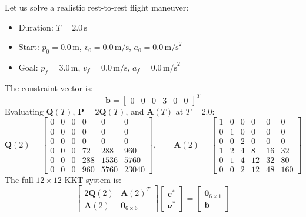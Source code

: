 \documentclass[11pt,a4paper]{article}
\begin{document}
Let us solve a realistic rest-to-rest flight maneuver:
\begin{itemize}
    \item Duration: $T = 2.0\,\text{s}$
    \item Start: $p_0 = 0.0\,\text{m}$, $v_0 = 0.0\,\text{m/s}$, $a_0 = 0.0\,\text{m/s}^2$
    \item Goal: $p_f = 3.0\,\text{m}$, $v_f = 0.0\,\text{m/s}$, $a_f = 0.0\,\text{m/s}^2$
\end{itemize}
The constraint vector is:
\begin{equation}
\mathbf{b} = \begin{bmatrix} 0 & 0 & 0 & 3 & 0 & 0 \end{bmatrix}^T
\end{equation}
Evaluating $\mathbf{Q}(T)$, $\mathbf{P} = 2\mathbf{Q}(T)$, and $\mathbf{A}(T)$ at $T = 2.0$:
\begin{equation}
\mathbf{Q}(2) = \begin{bmatrix}
0 & 0 & 0 & 0 & 0 & 0 \\
0 & 0 & 0 & 0 & 0 & 0 \\
0 & 0 & 0 & 0 & 0 & 0 \\
0 & 0 & 0 & 72 & 288 & 960 \\
0 & 0 & 0 & 288 & 1536 & 5760 \\
0 & 0 & 0 & 960 & 5760 & 23040
\end{bmatrix}, \qquad
\mathbf{A}(2) = \begin{bmatrix}
1 & 0 & 0 & 0 & 0 & 0 \\
0 & 1 & 0 & 0 & 0 & 0 \\
0 & 0 & 2 & 0 & 0 & 0 \\
1 & 2 & 4 & 8 & 16 & 32 \\
0 & 1 & 4 & 12 & 32 & 80 \\
0 & 0 & 2 & 12 & 48 & 160
\end{bmatrix}
\end{equation}
The full $12 \times 12$ KKT system is:
\begin{equation}
\begin{bmatrix}
2\mathbf{Q}(2) & \mathbf{A}(2)^T \\
\mathbf{A}(2) & \mathbf{0}_{6 \times 6}
\end{bmatrix}
\begin{bmatrix}
\mathbf{c}^* \\
\boldsymbol{\nu}^*
\end{bmatrix}
=
\begin{bmatrix}
\mathbf{0}_{6 \times 1} \\
\mathbf{b}
\end{bmatrix}
\end{equation}
\end{document}
